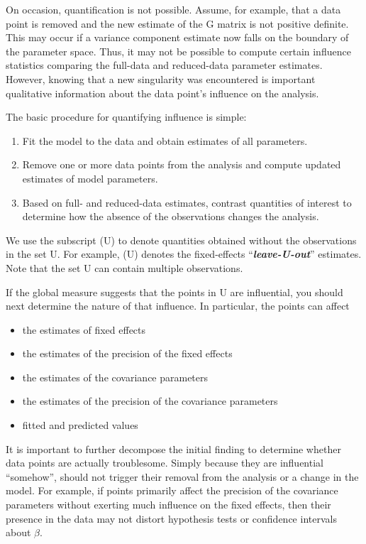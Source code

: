 \documentclass[12pt, a4paper]{article}
\begin{document}
			On occasion, quantification is not possible. Assume, for example, that a data point is removed
			and the new estimate of the G matrix is not positive definite. This may occur if a variance component
			estimate now falls on the boundary of the parameter space. Thus, it may not be possible to compute certain
			influence statistics comparing the full-data and reduced-data parameter estimates. However, knowing that
			a new singularity was encountered is important qualitative information about the data point’s influence on
			the analysis.
			
			The basic procedure for quantifying influence is simple:
			
			\begin{enumerate}
				\item Fit the model to the data and obtain estimates of all parameters.
				\item Remove one or more data points from the analysis and compute updated estimates of model parameters.
				\item Based on full- and reduced-data estimates, contrast quantities of interest to determine how the absence
				of the observations changes the analysis.
			\end{enumerate}
			We use the subscript (U) to denote quantities obtained without the observations in the set U. For example,
			(U) denotes the fixed-effects “\textit{\textbf{leave-U-out}}” estimates. Note that the set U can contain multiple observations.
			
			
			If the global measure suggests that the points in U are influential, you should next determine the nature of
			that influence. In particular, the points can affect
			\begin{itemize}
				\item the estimates of fixed effects
				\item the estimates of the precision of the fixed effects
				\item the estimates of the covariance parameters
				\item the estimates of the precision of the covariance parameters
				\item fitted and predicted values
			\end{itemize}
			
			It is important to further decompose the initial finding to determine whether data points are actually troublesome.
			Simply because they are influential “somehow”, should not trigger their removal from the analysis or
			a change in the model. For example, if points primarily affect the precision of the covariance parameters
			without exerting much influence on the fixed effects, then their presence in the data may not distort hypothesis
			tests or confidence intervals about $\beta$.
			
\end{document}
